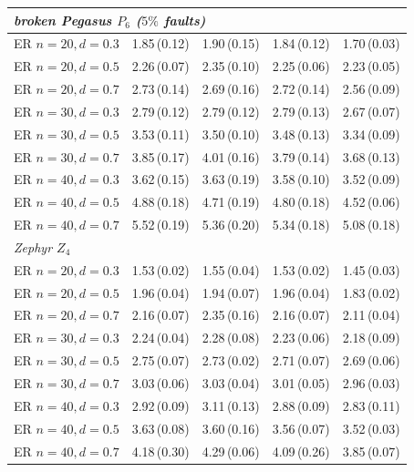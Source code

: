 \documentclass[acmsmall,anonymous,nonacm]{acmart}
\begin{document}
\begin{table}[h]
\begin{tabular}{lcccc}
\midrule
\multicolumn{5}{l}{\emph{broken Pegasus $P_6$ ($5\%$ faults)}}\\
\midrule
ER $n{=}20,d{=}0.3$ & 1.85\,(0.12) & 1.90\,(0.15) & 1.84\,(0.12) & 1.70\,(0.03) \\
ER $n{=}20,d{=}0.5$ & 2.26\,(0.07) & 2.35\,(0.10) & 2.25\,(0.06) & 2.23\,(0.05) \\
ER $n{=}20,d{=}0.7$ & 2.73\,(0.14) & 2.69\,(0.16) & 2.72\,(0.14) & 2.56\,(0.09) \\
ER $n{=}30,d{=}0.3$ & 2.79\,(0.12) & 2.79\,(0.12) & 2.79\,(0.13) & 2.67\,(0.07) \\
ER $n{=}30,d{=}0.5$ & 3.53\,(0.11) & 3.50\,(0.10) & 3.48\,(0.13) & 3.34\,(0.09) \\
ER $n{=}30,d{=}0.7$ & 3.85\,(0.17) & 4.01\,(0.16) & 3.79\,(0.14) & 3.68\,(0.13) \\
ER $n{=}40,d{=}0.3$ & 3.62\,(0.15) & 3.63\,(0.19) & 3.58\,(0.10) & 3.52\,(0.09) \\
ER $n{=}40,d{=}0.5$ & 4.88\,(0.18) & 4.71\,(0.19) & 4.80\,(0.18) & 4.52\,(0.06) \\
ER $n{=}40,d{=}0.7$ & 5.52\,(0.19) & 5.36\,(0.20) & 5.34\,(0.18) & 5.08\,(0.18) \\
\midrule
\multicolumn{5}{l}{\emph{Zephyr $Z_4$}}\\
\midrule
ER $n{=}20,d{=}0.3$ & 1.53\,(0.02) & 1.55\,(0.04) & 1.53\,(0.02) & 1.45\,(0.03) \\
ER $n{=}20,d{=}0.5$ & 1.96\,(0.04) & 1.94\,(0.07) & 1.96\,(0.04) & 1.83\,(0.02) \\
ER $n{=}20,d{=}0.7$ & 2.16\,(0.07) & 2.35\,(0.16) & 2.16\,(0.07) & 2.11\,(0.04) \\
ER $n{=}30,d{=}0.3$ & 2.24\,(0.04) & 2.28\,(0.08) & 2.23\,(0.06) & 2.18\,(0.09) \\
ER $n{=}30,d{=}0.5$ & 2.75\,(0.07) & 2.73\,(0.02) & 2.71\,(0.07) & 2.69\,(0.06) \\
ER $n{=}30,d{=}0.7$ & 3.03\,(0.06) & 3.03\,(0.04) & 3.01\,(0.05) & 2.96\,(0.03) \\
ER $n{=}40,d{=}0.3$ & 2.92\,(0.09) & 3.11\,(0.13) & 2.88\,(0.09) & 2.83\,(0.11) \\
ER $n{=}40,d{=}0.5$ & 3.63\,(0.08) & 3.60\,(0.16) & 3.56\,(0.07) & 3.52\,(0.03) \\
ER $n{=}40,d{=}0.7$ & 4.18\,(0.30) & 4.29\,(0.06) & 4.09\,(0.26) & 3.85\,(0.07) \\
\bottomrule
\end{tabular}
\end{table}



\end{document}

